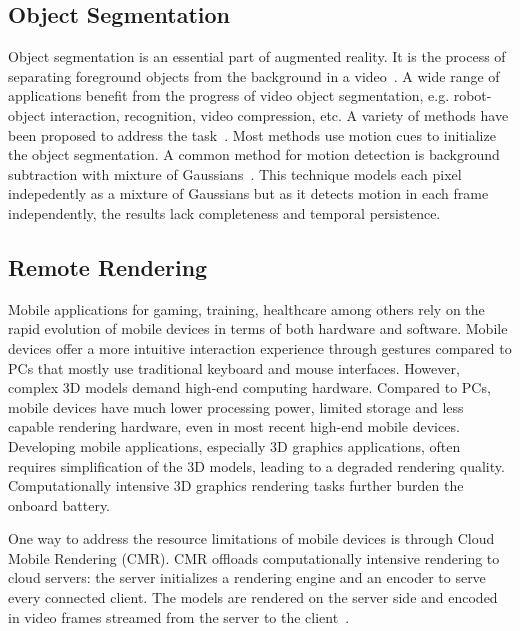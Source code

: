\subsection{Object Segmentation}

Object segmentation is an essential part of augmented reality.
It is the process of separating foreground objects from the background in a video~\cite{papazoglou2013}. A wide range of applications benefit from the progress of video object segmentation, e.g. robot-object interaction, recognition, video compression, etc.
%
A variety of methods have been proposed to address the task~\cite{papazoglou2013,ma2012,wang2015,brox2010,taylor2015}. Most methods use motion cues to initialize the object segmentation.
A common method for motion detection is  background subtraction with mixture of Gaussians~\cite{kaewtrakulpong2002,zivkovic2004}. This technique models each pixel indepedently as a mixture of Gaussians 
but as it detects motion in each frame independently, the results lack completeness and temporal persistence.

\subsection{Remote Rendering}

Mobile applications for gaming, training, healthcare among others rely on the rapid evolution of mobile devices in terms of both hardware and software.
Mobile devices offer a more intuitive interaction experience through gestures 
compared to PCs that mostly use traditional keyboard and mouse interfaces.
However, complex 3D models demand high-end computing hardware. Compared to PCs, mobile devices have much lower processing power, limited storage and less capable rendering hardware, even in most recent high-end mobile devices.
Developing mobile applications, especially 3D graphics applications, often requires simplification of the 3D models, leading to a degraded rendering quality.
Computationally intensive 3D graphics rendering tasks further burden the onboard battery.

One way to address the resource limitations of mobile devices is through Cloud Mobile Rendering (CMR).
CMR offloads computationally intensive rendering to cloud servers:
the server initializes a rendering engine and an encoder to serve every connected client. The models are rendered on the server side and encoded in video frames streamed from the server to the client~\cite{lamberti2007,lu2011,ma2017,chang2004,simoens2012}.

